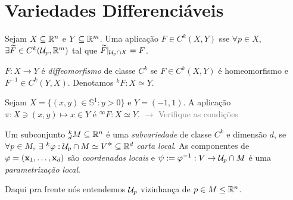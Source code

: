 \section{Variedades Differenciáveis}

\begin{definition}
    Sejam \(X\subseteq \mathbb{R}^n\) e \(Y\subseteq \mathbb{R}^m\). Uma aplicação \(F\in C^k(X,Y)\) sse \(\forall p \in X\), \(\exists \widetilde{F} \in C^k(\mathcal{U}_p, \mathbb{R}^m)\) tal que \( \widetilde{F}|_{\mathcal{U}_p \cap X} = F\).    
\end{definition}


\begin{definition}
    \(F: X \to Y\) é \emph{diffeomorfismo} de classe \(C^k\) se \(F\in C^k(X,Y)\) é homeomorfismo e \(F^{-1}\in C^k(Y,X)\). Denotamos \(^k F : X \simeq Y \). 
\end{definition}
\begin{example}
    Sejam \(X= \{(x,y) \in \mathbb{S}^1: y > 0 \}\) e \(Y = (-1,1)\). A aplicação \(\pi: X \ni (x,y) \mapsto x \in Y\) é \(^\infty F: X\simeq Y \). \textcolor{gray}{\(\rightarrow\) Verifique as condições}
\end{example}
\begin{definition}
    Um subconjunto \(^k_d M \subseteq \mathbb{R}^n\) é uma \emph{subvariedade} de classe \(C^k\) e dimensão \(d\), se  \(\forall p \in M \), \(\exists\ ^k \varphi: \U_p \cap M \simeq V\ab \subseteq \R^d\) \emph{carta local}. As componentes de \(\varphi = (\textbf{x}_1, \ldots, \textbf{x}_d)\) são \emph{coordenadas locais} e \(\psi := \varphi^{-1} : V \to \mathcal{U}_p \cap M \) é uma \emph{parametrização local}.
\end{definition}

\begin{note}
    Daqui pra frente nós entendemos \(\mathcal{U}_p\) vizinhança de \(p\in M\leq \mathbb{R}^n\). 
\end{note}

